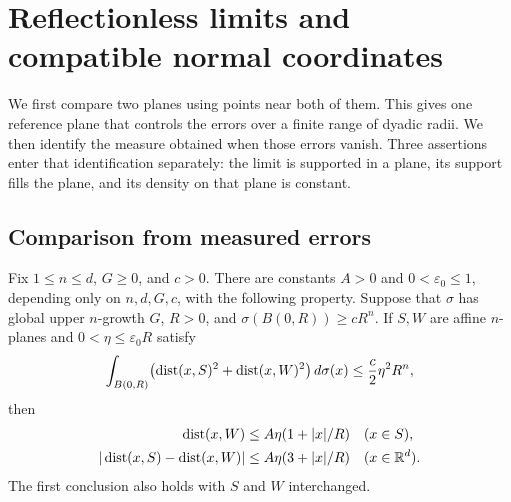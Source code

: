 \section[Reflectionless limits and normal coordinates]{Reflectionless limits and compatible normal coordinates}
\label{sec:planar-limits}

We first compare two planes using points near both of them. This gives one
reference plane that controls the errors over a finite range of dyadic radii.
We then identify the
measure obtained when those errors vanish.  Three assertions enter that
identification separately: the limit is supported in a plane, its support
fills the plane, and its density on that plane is constant.

\subsection{Comparison from measured errors}

\begin{lemma}\label{lem:plane-comparison}
Fix $1\le n\le d$, $G\ge0$, and $c>0$.  There are constants
$A>0$ and $0<\varepsilon_0\le1$, depending only on $n,d,G,c$, with the
following property.  Suppose that $\sigma$ has global upper $n$-growth $G$,
$R>0$, and $\sigma(B(0,R))\ge cR^n$.  If $S,W$ are affine $n$-planes and
$0<\eta\le\varepsilon_0R$ satisfy
\begin{equation}\label{eq:joint-plane-error}
 \int_{B(0,R)}\bigl(\operatorname{dist}(x,S)^2+\operatorname{dist}(x,W)^2\bigr)\,d\sigma(x)
 \le \frac c2\eta^2R^n,
\end{equation}
then
\begin{align}
 \operatorname{dist}(x,W)&\le A\eta(1+|x|/R) &&(x\in S),\label{eq:plane-comparison}\\
 |\operatorname{dist}(x,S)-\operatorname{dist}(x,W)|&\le A\eta(3+|x|/R)
       &&(x\in\mathbb R^d).\label{eq:distance-comparison}
\end{align}
The first conclusion also holds with $S$ and $W$ interchanged.
\end{lemma}

